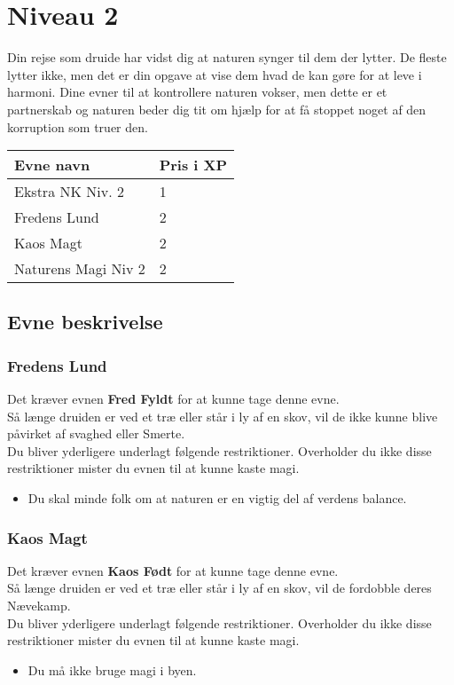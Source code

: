 \chapter{Niveau 2}

Din rejse som druide har vidst dig at naturen synger til dem der lytter. De fleste lytter ikke, men det er din opgave at vise dem hvad de kan gøre for at leve i harmoni. Dine evner til at kontrollere naturen vokser, men dette er et partnerskab og naturen beder dig tit om hjælp for at få stoppet noget af den korruption som truer den.

\begin{table}[H]
    \centering
    \begin{tabular}{|p{}|p{}|}
    \rowcolor{cerulean!80}\hline
        Evne navn & Pris i XP \\\hline
        Ekstra NK Niv. 2 & 1\\\hline
        Fredens Lund & 2 \\\hline
        Kaos Magt & 2 \\\hline
        Naturens Magi Niv 2 & 2\\\hline
    \end{tabular}
\end{table}
\section{Evne beskrivelse}



\subsection{Fredens Lund}
Det kræver evnen \textbf{Fred Fyldt} for at kunne tage denne evne.\\
Så længe druiden er ved et træ eller står i ly af en skov, vil de ikke kunne blive påvirket af svaghed eller Smerte.\\
Du bliver yderligere underlagt følgende restriktioner. Overholder du ikke disse restriktioner mister du evnen til at kunne kaste magi.
\begin{itemize}
    \item Du skal minde folk om at naturen er en vigtig del af verdens balance.
\end{itemize}

\subsection{Kaos Magt}
Det kræver evnen \textbf{Kaos Født} for at kunne tage denne evne.\\
Så længe druiden er ved et træ eller står i ly af en skov, vil de fordobble deres Nævekamp.\\
Du bliver yderligere underlagt følgende restriktioner. Overholder du ikke disse restriktioner mister du evnen til at kunne kaste magi.
\begin{itemize}
    \item Du må ikke bruge magi i byen.
\end{itemize}

